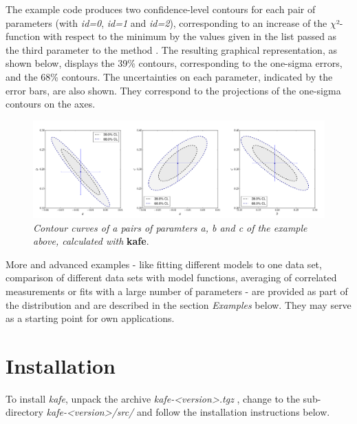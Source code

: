 \documentclass[a4paper,10pt,english]{sphinxmanual}
\begin{document}
The example code produces two confidence-level contours
for each pair of parameters (with \emph{id=0}, \emph{id=1} and \emph{id=2}),
corresponding to an increase of the \(\chi\)²-function
with respect to the minimum by the values given
in the list passed as the third parameter to the
method . The resulting
graphical representation, as shown below, displays the
39\% contours, corresponding to the one-sigma errors, and
the 68\% contours. The uncertainties on each parameter,
indicated by the error bars, are also shown. They
correspond to the projections of the one-sigma contours
on the axes.
\begin{figure}[htbp]
\centering
\capstart

\includegraphics{kafe_example0_contours.png}
\caption{\emph{Contour curves of a pairs of paramters a, b and c
of the example above, calculated with} \textbf{kafe}.}\end{figure}

More and advanced examples - like fitting different models
to one data set, comparison of different data sets with model
functions, averaging of correlated measurements or fits with
a large number of parameters -
are provided as part of the  distribution and are
described in the section \emph{Examples} below. They may serve as
a starting point for own applications.


\section{Installation}
\label{index:installation}
To install \emph{kafe}, unpack the archive \emph{kafe-\textless{}version\textgreater{}.tgz} , change to
the sub-directory  \emph{kafe-\textless{}version\textgreater{}/src/}  and follow the installation
instructions below.
\end{document}
